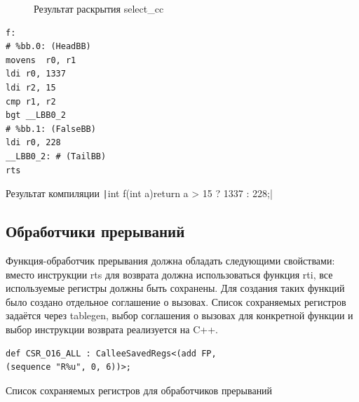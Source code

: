 \documentclass[a4paper,14pt]{extarticle}
\begin{document}
\begin{figure}[h!] %
	\begin{center}
		\caption{Результат раскрытия select\_cc}
	\end{center}
\end{figure}

\begin{listing}[h!]
\begin{verbatim}
f:
# %bb.0: (HeadBB)
movens	r0, r1
ldi	r0, 1337
ldi	r2, 15
cmp	r1, r2
bgt	__LBB0_2
# %bb.1: (FalseBB)
ldi	r0, 228
__LBB0_2: # (TailBB)
rts
\end{verbatim}
\caption{Результат компиляции \texttt|int f(int a){return a > 15 ? 1337 : 228;}| }
\end{listing}


\subsection{Обработчики прерываний}
Функция-обработчик прерывания должна обладать следующими свойствами: вместо инструкции rts для возврата должна использоваться функция rti, все используемые регистры должны быть сохранены. Для создания таких функций было создано отдельное соглашение о вызовах. Список сохраняемых регистров задаётся через tablegen, выбор соглашения о вызовах для конкретной функции и выбор инструкции возврата реализуется на C++.
\begin{listing}[h!]
	\begin{verbatim}
def CSR_O16_ALL : CalleeSavedRegs<(add FP,
(sequence "R%u", 0, 6))>;
	\end{verbatim}
	\caption{Список сохраняемых регистров для обработчиков прерываний}
\end{listing}
\end{document}
